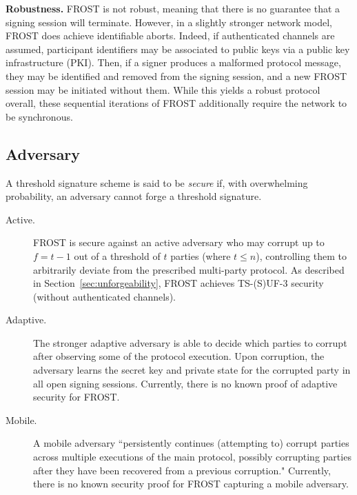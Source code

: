 \noindent \textbf{Robustness.} FROST is not robust, meaning that there is no guarantee that a signing session will terminate.
However, in a slightly stronger network model, FROST does achieve identifiable aborts.
Indeed, if authenticated channels are assumed, participant identifiers may be associated to public keys via a public key infrastructure (PKI).
Then, if a signer produces a malformed protocol message, they may be identified and removed from the signing session, and a new FROST session may be initiated without them.
While this yields a robust protocol overall, these sequential iterations of FROST additionally require the network to be synchronous.

\subsection{Adversary}

A threshold signature scheme is said to be \emph{secure} if, with overwhelming probability, an adversary cannot forge a threshold signature.

\begin{description}

\item[Active.] FROST is secure against an active adversary who may corrupt up to $f = t-1$ out of a threshold of $t$ parties (where $t \leq n$), controlling them to arbitrarily deviate from the prescribed multi-party protocol.   As described in Section~\ref{sec:unforgeability}, FROST achieves TS-(S)UF-3 security~\cite{BellareCKMTZ22} (without authenticated channels).

\item[Adaptive.] The stronger adaptive adversary is able to decide which parties to corrupt after observing some of the protocol execution. 
Upon corruption, the adversary learns the secret key and private state for the corrupted party in all open signing sessions.
Currently, there is no known proof of adaptive security for FROST.

\item[Mobile.] A mobile adversary ``persistently continues (attempting to) corrupt parties across multiple executions of the main protocol, possibly corrupting parties after they have been recovered from a previous corruption."
Currently, there is no known security proof for FROST capturing a mobile adversary.

\end{description}

